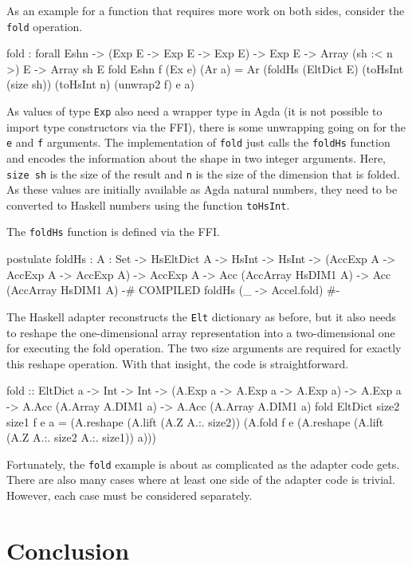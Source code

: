 \documentclass{llncs}
\begin{document}
As an example for a function that requires more work on both sides,
consider the \texttt{fold} operation. 
\begin{code}
fold : forall {E}{sh}{n}
     -> (Exp E -> Exp E -> Exp E)
     -> Exp E
     -> Array (sh :< n >) E
     -> Array sh E
fold {E}{sh}{n} f (Ex e) (Ar a) =
  Ar (foldHs (EltDict E) (toHsInt (size sh)) (toHsInt n)
             (unwrap2 f) e a)
\end{code}
As values of type \texttt{Exp} also need a wrapper type in Agda (it is
not possible to import type constructors via the FFI), there is some
unwrapping going on for the \texttt{e} and \texttt{f}
arguments. The implementation of \texttt{fold} just calls the
\texttt{foldHs} function and encodes the information about the shape
in two integer arguments. Here, \texttt{size sh} is the size of the
result and \texttt{n} is the size of the dimension that is folded. As
these values are initially available as Agda natural numbers, they need to
be converted to Haskell numbers using the function \texttt{toHsInt}.

The \texttt{foldHs} function is defined via the FFI.
\begin{code}
postulate
  foldHs : {A : Set}
          -> HsEltDict A
          -> HsInt
          -> HsInt
          -> (AccExp A -> AccExp A -> AccExp A)
          -> AccExp A
          -> Acc (AccArray HsDIM1 A)
          -> Acc (AccArray HsDIM1 A)
  {-# COMPILED foldHs      (\_ -> Accel.fold) #-}
\end{code}
The Haskell adapter reconstructs the \texttt{Elt} dictionary
as before, but it also needs to reshape the one-dimensional array
representation into a two-dimensional one for executing the fold
operation. The two size arguments are required for exactly this
reshape operation. With that insight, the code is straightforward.
\begin{hcode}
fold :: EltDict a
     -> Int -> Int
     -> (A.Exp a -> A.Exp a -> A.Exp a)
     -> A.Exp a
     -> A.Acc (A.Array A.DIM1 a)
     -> A.Acc (A.Array A.DIM1 a)
fold EltDict size2 size1 f e a =
     (A.reshape (A.lift (A.Z A.:. size2))
      (A.fold f e
       (A.reshape (A.lift (A.Z A.:. size2 A.:. size1)) a)))
\end{hcode}

Fortunately, the \texttt{fold} example is about as complicated as the
adapter code gets. There are also many cases where at least one side
of the adapter code is trivial. However, each case must be considered
separately. 

\section{Conclusion}
\label{sec:conclusion}
\end{document}
